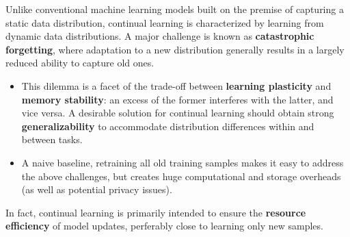 \documentclass[9pt,dvipsnames]{beamer}
\begin{document}
\begin{frame}
    Unlike conventional machine learning models built on the premise of capturing a static data distribution, continual learning is characterized by learning from dynamic data distributions. A major challenge is known as \textbf{catastrophic forgetting}, where adaptation to a new distribution generally results in a largely reduced ability to capture old ones.
    \begin{itemize}
        \item This dilemma is a facet of the trade-off between \textbf{learning plasticity} and \textbf{memory stability}: an excess of the former interferes with the latter, and vice versa. A desirable solution for continual learning should obtain strong \textbf{generalizability} to accommodate distribution differences within and between tasks.
        \item A naive baseline, retraining all old training samples makes it easy to address the above challenges, but creates huge computational and storage overheads (as well as potential privacy issues).
    \end{itemize}
    In fact, continual learning is primarily intended to ensure the \textbf{resource efficiency} of model updates, perferably close to learning only new samples.
\end{frame}
\end{document}
